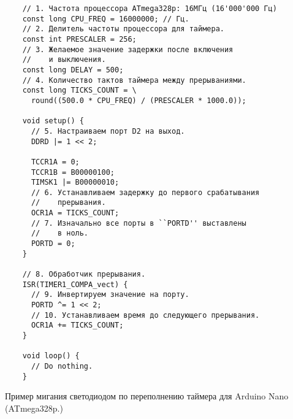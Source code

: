 \documentclass[../sparc.tex]{subfiles}
\begin{document}
\begin{listing}[H]
  \begin{verbatim}
    // 1. Частота процессора ATmega328p: 16МГц (16'000'000 Гц)
    const long CPU_FREQ = 16000000; // Гц.
    // 2. Делитель частоты процессора для таймера.
    const int PRESCALER = 256;
    // 3. Желаемое значение задержки после включения
    //    и выключения.
    const long DELAY = 500;
    // 4. Количество тактов таймера между прерываниями.
    const long TICKS_COUNT = \
      round((500.0 * CPU_FREQ) / (PRESCALER * 1000.0));

    void setup() {
      // 5. Настраиваем порт D2 на выход.
      DDRD |= 1 << 2;

      TCCR1A = 0;
      TCCR1B = B00000100;
      TIMSK1 |= B00000010;
      // 6. Устанавливаем задержку до первого срабатывания
      //    прерывания.
      OCR1A = TICKS_COUNT;
      // 7. Изначально все порты в ``PORTD'' выставлены
      //    в ноль.
      PORTD = 0;
    }

    // 8. Обработчик прерывания.
    ISR(TIMER1_COMPA_vect) {
      // 9. Инвертируем значение на порту.
      PORTD ^= 1 << 2;
      // 10. Устанавливаем время до следующего прерывания.
      OCR1A += TICKS_COUNT;
    }

    void loop() {
      // Do nothing.
    }
  \end{verbatim}
  \caption{Пример мигания светодиодом по переполнению таймера для Arduino Nano
    (ATmega328p.)}
  \label{listing:mcu-timer-example-2}
\end{listing}
\end{document}
